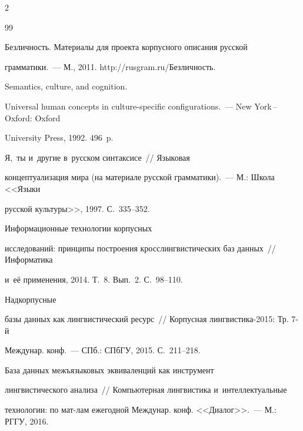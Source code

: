 \begin{multicols}{2}
  

{\small\frenchspacing

 {%


 \begin{thebibliography}{99}


 Безличность. Материалы для проекта корпусного описания русской 

грамматики.~--- М., 2011. {\sf http://rusgram.ru/Безличность}.


 Semantics, culture, and cognition. 

Universal human concepts in culture-specific configurations.~--- New York\,--\,Oxford: Oxford 

University Press, 1992. 496~p.


 Я,~ты и~другие в~русском синтаксисе~// Языковая 

концептуализация мира (на материале русской грамматики).~--- М.: Школа <<Языки 

русской культуры>>, 1997. С.~335--352.


 Инфор\-мационные технологии корпусных 

исследований: принципы построения кросслингвистических баз данных~// Информатика 

и~её применения, 2014. Т.~8. Вып.~2. С.~98--110.


 Надкорпусные 

базы данных как лингвистический ресурс~// Корпусная лингвистика-2015: Тр. 7-й 

Междунар. конф.~--- СПб.: СПбГУ, 2015. С.~211--218.


 База данных межъязыковых эквиваленций как инструмент 

лингвистического анализа~// Компьютерная лингвистика и~интеллектуальные 

технологии: по мат-лам ежегодной Междунар. конф. <<Диалог>>.~--- М.: РГГУ, 2016. 


\end{thebibliography}}}
\end{multicols}

